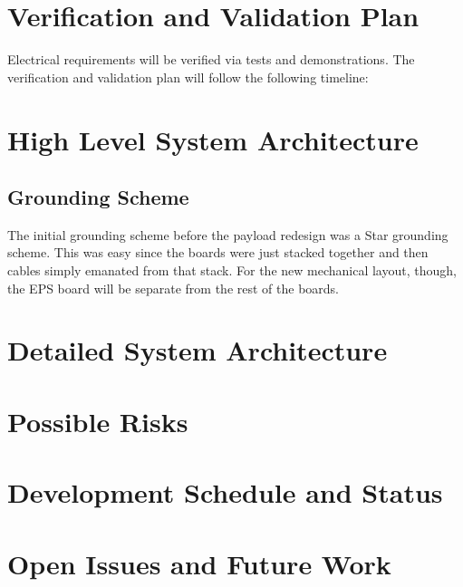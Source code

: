 \documentclass[12pt,a4paper]{article}
\begin{document}
   
    
    \section{Verification and Validation Plan}\label{sec:verifcation_validation}
    Electrical requirements will be verified via tests and demonstrations. The verification and validation plan will follow the following timeline:
    


    \section{High Level System Architecture}
    \subsection{Grounding Scheme}
    The initial grounding scheme before the payload redesign was a Star grounding 
    scheme. This was easy since the boards were just stacked together and then 
    cables simply emanated from that stack. For the new mechanical layout, though, 
    the EPS board will be separate from the rest of the boards. 

    \section{Detailed System Architecture}\label{sec:Det_Sys_Arc}

    \section{Possible Risks}

    \section{Development Schedule and Status}

    \section{Open Issues and Future Work}

    \printbibliography
    
            
    \newpage


\end{document}
